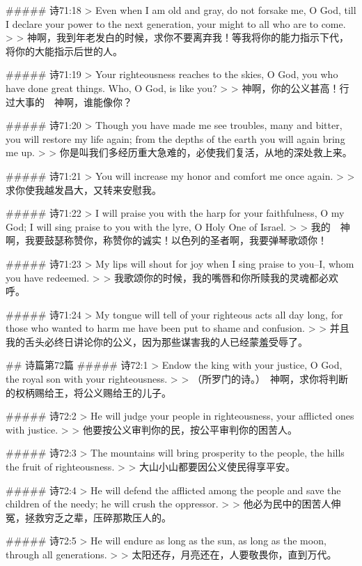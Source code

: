 ##### 诗71:18
> Even when I am old and gray, do not forsake me, O God, till I declare your power to the next generation, your might to all who are to come.
>
> 神啊，我到年老发白的时候，求你不要离弃我！等我将你的能力指示下代，将你的大能指示后世的人。


##### 诗71:19
> Your righteousness reaches to the skies, O God, you who have done great things. Who, O God, is like you?
>
> 神啊，你的公义甚高！行过大事的　神啊，谁能像你？


##### 诗71:20
> Though you have made me see troubles, many and bitter, you will restore my life again; from the depths of the earth you will again bring me up.
>
> 你是叫我们多经历重大急难的，必使我们复活，从地的深处救上来。


##### 诗71:21
> You will increase my honor and comfort me once again.
>
> 求你使我越发昌大，又转来安慰我。


##### 诗71:22
> I will praise you with the harp for your faithfulness, O my God; I will sing praise to you with the lyre, O Holy One of Israel.
>
> 我的　神啊，我要鼓瑟称赞你，称赞你的诚实！以色列的圣者啊，我要弹琴歌颂你！


##### 诗71:23
> My lips will shout for joy when I sing praise to you--I, whom you have redeemed.
>
> 我歌颂你的时候，我的嘴唇和你所赎我的灵魂都必欢呼。


##### 诗71:24
> My tongue will tell of your righteous acts all day long, for those who wanted to harm me have been put to shame and confusion.
>
> 并且我的舌头必终日讲论你的公义，因为那些谋害我的人已经蒙羞受辱了。


## 诗篇第72篇
##### 诗72:1
> Endow the king with your justice, O God, the royal son with your righteousness.
>
> （所罗门的诗。）　神啊，求你将判断的权柄赐给王，将公义赐给王的儿子。


##### 诗72:2
> He will judge your people in righteousness, your afflicted ones with justice.
>
> 他要按公义审判你的民，按公平审判你的困苦人。


##### 诗72:3
> The mountains will bring prosperity to the people, the hills the fruit of righteousness.
>
> 大山小山都要因公义使民得享平安。


##### 诗72:4
> He will defend the afflicted among the people and save the children of the needy; he will crush the oppressor.
>
> 他必为民中的困苦人伸冤，拯救穷乏之辈，压碎那欺压人的。


##### 诗72:5
> He will endure as long as the sun, as long as the moon, through all generations.
>
> 太阳还存，月亮还在，人要敬畏你，直到万代。


